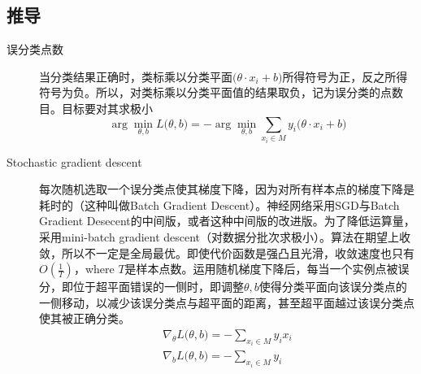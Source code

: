 \documentclass{ctexart}
\begin{document}
\subsection{推导}
\label{derivations}
\begin{description}
\item[误分类点数]
当分类结果正确时，类标乘以分类平面$\big(\theta\cdot x_i+b\big)$所得符号为正，反之所得符号为负。所以，对类标乘以分类平面值的结果取负，记为误分类的点数目。目标要对其求极小
\begin{equation}
\arg\min\limits_{\theta,b}L\big(\theta,b \big)=-\arg\min\limits_{\theta,b}\sum\limits_{x_i\in M}y_i\big(\theta\cdot x_i+b\big)
\end{equation}

\item[Stochastic gradient descent]
每次随机选取一个误分类点使其梯度下降，因为对所有样本点的梯度下降是耗时的（这种叫做Batch Gradient Descent）。神经网络采用SGD与Batch Gradient Desecent的中间版，或者这种中间版的改进版。为了降低运算量，采用mini-batch gradient descent（对数据分批次求极小）。算法在期望上收敛，所以不一定是全局最优。即使代价函数是强凸且光滑，收敛速度也只有$O\left(\frac{1}{T}\right)$，where $T$是样本点数。运用随机梯度下降后，每当一个实例点被误分，即位于超平面错误的一侧时，即调整$\theta,b$使得分类平面向该误分类点的一侧移动，以减少该误分类点与超平面的距离，甚至超平面越过该误分类点使其被正确分类\cite{LiHang:Statistic}。
\begin{equation}
\begin{array}{lcl}
\nabla_{\theta}L\big(\theta,b\big)=-\sum\limits_{x_i\in M}y_ix_i \\
\nabla_{b}L\big(\theta,b\big)=-\sum\limits_{x_i\in M}y_i
\end{array}
\end{equation}
\end{description}

%
\end{document}
